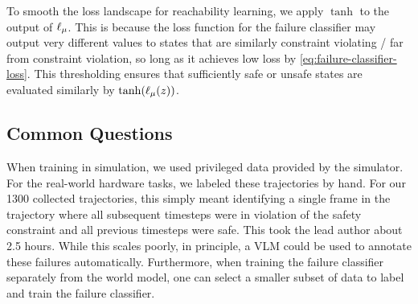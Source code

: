 To smooth the loss landscape for reachability learning, we apply $\tanh$ to the output of $\ell_\mu$. This is because the loss function for the failure classifier may output very different values to states that are similarly constraint violating / far from constraint violation, so long as it achieves low loss by \eqref{eq:failure-classifier-loss}. This thresholding ensures that sufficiently safe or unsafe states are evaluated similarly by $\tanh(\ell_\mu(z))$.


\subsection{Common Questions}



When training in simulation, we used privileged data provided by the simulator. For the real-world hardware tasks, we labeled these trajectories by hand. For our 1300 collected trajectories, this simply meant identifying a single frame in the trajectory where all subsequent timesteps were in violation of the safety constraint and all previous timesteps were safe. This took the lead author about 2.5 hours. While this scales poorly, in principle, a VLM could be used to annotate these failures automatically. Furthermore, when training the failure classifier separately from the world model, one can select a smaller subset of data to label and train the failure classifier.







